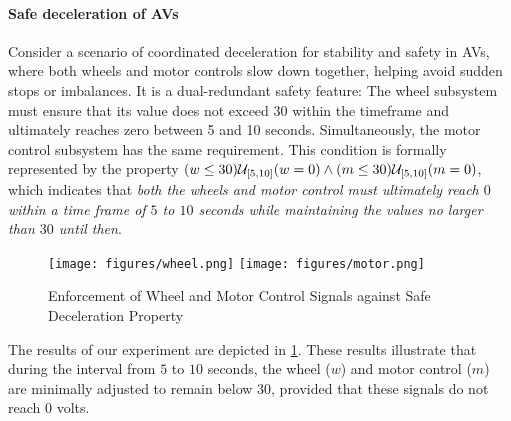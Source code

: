     \paragraph{Safe deceleration of AVs}
    Consider a scenario of coordinated deceleration for stability and safety in AVs, where both wheels and motor controls slow down together, helping avoid sudden stops or imbalances. It is a dual-redundant safety feature: The wheel subsystem must ensure that its value does not exceed 30 within the timeframe and ultimately reaches zero between 5 and 10 seconds. Simultaneously, the motor control subsystem has the same requirement. This condition is formally represented by the property $(w \leq 30)\until_{[5,10]} (w = 0) \land (m \leq 30)\until_{[5,10]} (m = 0)$, which indicates that \textit{both the wheels and motor control must ultimately reach $0$ within a time frame of $5$ to $10$ seconds while maintaining the values no larger than $30$ until then}.
    \begin{figure}[t]
        \centering
        \texttt{[image: figures/wheel.png]}
        \texttt{[image: figures/motor.png]}
        \caption{Enforcement of Wheel and Motor Control Signals against Safe Deceleration Property}
        \label{fig:wheel_motor}
    \end{figure}

    The results of our experiment are depicted in \cref{fig:wheel_motor}. These results illustrate that during the interval from $5$ to $10$ seconds, the wheel ($w$) and motor control ($m$) are minimally adjusted to remain below $30$, provided that these signals do not reach $0$ volts.
    
    
